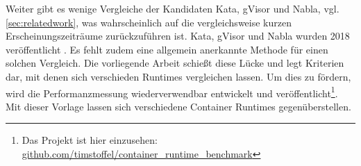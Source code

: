 Weiter gibt es wenige Vergleiche der Kandidaten Kata, gVisor und Nabla, vgl. \ref{sec:relatedwork}, was wahrscheinlich auf die vergleichsweise kurzen Erscheinungszeiträume zurückzuführen ist. Kata,  gVisor und Nabla wurden 2018 veröffentlicht \cite[vgl.][106]{UdoSeidel.2018, NicolasLacasse.2018052, VaughanNichols.20180716}. Es fehlt zudem eine allgemein anerkannte Methode für einen solchen Vergleich.
Die vorliegende Arbeit schießt diese Lücke und legt Kriterien dar, mit denen sich verschieden Runtimes vergleichen lassen. Um dies zu fördern, wird die Performanzmessung wiederverwendbar entwickelt und veröffentlicht\footnote{Das Projekt ist hier einzusehen: \href{https://github.com/timstoffel/container_runtime_benchmark}{github.com/timstoffel/container\_runtime\_benchmark}}.
Mit dieser Vorlage lassen sich verschiedene Container Runtimes gegenüberstellen.